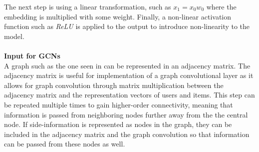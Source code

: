 The next step is using a linear transformation, such as $x_1 = x_0w_0$ where the embedding is multiplied with some weight.
Finally, a non-linear activation function such as \textit{ReLU} is applied to the output to introduce non-linearity to the model.
\\\\
\textbf{Input for GCNs}
\\
A graph such as the one seen in  can be represented in an adjacency matrix. 
The adjacency matrix is useful for implementation of a graph convolutional layer as it allows for graph convolution through matrix multiplication between the adjacency matrix and the representation vectors of users and items. 
This step can be repeated multiple times to gain higher-order connectivity, meaning that information is passed from neighboring nodes further away from the the central node\cite{SimplifyingGCN, KOrderConnectivity}.
If side-information is represented as nodes in the graph, they can be included in the adjacency matrix and the graph convolution so that information can be passed from these nodes as well.
